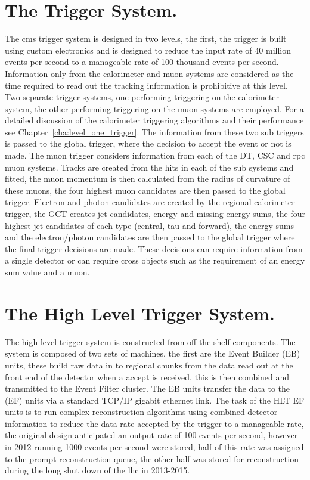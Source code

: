 \section{The \Lone Trigger System.} %
\label{sec:the_level_one_trigger_system}
The \ac{cms} trigger system is designed in two levels, the first, the \Lone 
trigger is built using custom electronics and is designed to reduce the input 
rate of 40 million events per second to a manageable rate of 100 thousand 
events per second. Information only from the calorimeter and muon systems are 
considered as the time required to read out the tracking information is 
prohibitive at this level. Two separate trigger systems, one performing 
triggering on the calorimeter system, the other performing triggering on the 
muon systems are employed. For a detailed discussion of the calorimeter 
triggering algorithms and their performance see 
Chapter~\ref{cha:level_one_trigger}. The information from these two sub 
triggers is passed to the global trigger, where the decision to accept the 
event or not is made. 
The muon trigger considers information from each of the DT, CSC and \ac{rpc} 
muon systems. Tracks are created from the hits in each of the sub systems and 
fitted, the muon momentum is then calculated from the radius of curvature of 
these muons, the four highest \PT muon candidates are then passed to the global 
trigger.
Electron and photon candidates are created by the regional calorimeter trigger, 
the GCT creates jet candidates, energy and missing energy sums, the four 
highest \ET jet candidates of each type (central, tau and forward), the energy 
sums and the electron/photon candidates are then passed to the global trigger 
where the final trigger decisions are made. These decisions can require 
information from a single detector or can require cross objects such as the 
requirement of an energy sum value and a muon.

\section{The High Level Trigger System.} %
\label{sec:the_high_level_trigger_system}
The high level trigger system is constructed from off the shelf components. 
The system is composed of two sets of machines, the first are the Event Builder 
(EB) units, these build raw data in to regional chunks from the data read out 
at the front end of the detector when a \Lone accept is received, this is then  
combined and transmitted to the Event Filter cluster. The EB units transfer the 
data to the (EF) units via a standard TCP/IP gigabit ethernet link.
The task of the HLT EF units is to run complex reconstruction algorithms using 
combined detector information to reduce the data rate accepted by the \Lone 
trigger to a manageable rate, the original design anticipated an output rate of 
100 events per second, however in 2012 running 1000 events per second were 
stored, half of this rate was assigned to the prompt reconstruction queue, 
the other half was stored for reconstruction during the long shut down of the 
\ac{lhc} in 2013-2015.


